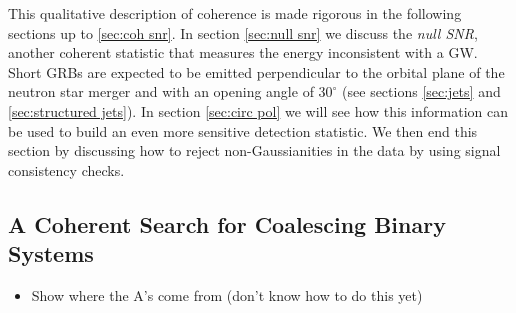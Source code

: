 \documentclass[11pt]{cuthesis}
\begin{document}
This qualitative description of coherence is made rigorous in the following sections up to \ref{sec:coh snr}. In section \ref{sec:null snr} we discuss the \textit{null SNR}, another coherent statistic that measures the energy inconsistent with a GW. Short GRBs are expected to be emitted perpendicular to the orbital plane of the neutron star merger and with an opening angle of $30^\circ$ (see sections \ref{sec:jets} and \ref{sec:structured jets}). In section \ref{sec:circ pol} we will see how this information can be used to build an even more sensitive detection statistic. We then end this section by discussing how to reject non-Gaussianities in the data by using signal consistency checks.

\subsection{A Coherent Search for Coalescing Binary Systems}
\begin{itemize}
\item Show where the A's come from (don't know how to do this yet)
\end{itemize}
\end{document}
